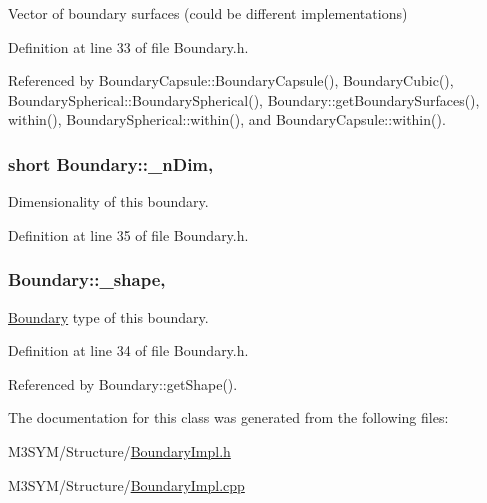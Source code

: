 Vector of boundary surfaces (could be different implementations) 



Definition at line 33 of file Boundary.\+h.



Referenced by Boundary\+Capsule\+::\+Boundary\+Capsule(), Boundary\+Cubic(), Boundary\+Spherical\+::\+Boundary\+Spherical(), Boundary\+::get\+Boundary\+Surfaces(), within(), Boundary\+Spherical\+::within(), and Boundary\+Capsule\+::within().

\hypertarget{classBoundary_a96f2294e0c822ab216fe5ab7e17258c7}{
\subsubsection[{\+\_\+n\+Dim}]{\setlength{\rightskip}{0pt plus 5cm}short Boundary\+::\+\_\+n\+Dim\hspace{0.3cm}{\ttfamily [protected]}, {\ttfamily [inherited]}}}\label{classBoundary_a96f2294e0c822ab216fe5ab7e17258c7}


Dimensionality of this boundary. 



Definition at line 35 of file Boundary.\+h.

\hypertarget{classBoundary_a04c10c9a7aea1924d779d392e29f94ff}{
\subsubsection[{\+\_\+shape}]{ Boundary\+::\+\_\+shape\hspace{0.3cm}{\ttfamily [protected]}, {\ttfamily [inherited]}}}\label{classBoundary_a04c10c9a7aea1924d779d392e29f94ff}


\hyperlink{classBoundary}{Boundary} type of this boundary. 



Definition at line 34 of file Boundary.\+h.



Referenced by Boundary\+::get\+Shape().



The documentation for this class was generated from the following files\+:\begin{DoxyCompactItemize}
\item 
M3\+S\+Y\+M/\+Structure/\hyperlink{BoundaryImpl_8h}{Boundary\+Impl.\+h}\item 
M3\+S\+Y\+M/\+Structure/\hyperlink{BoundaryImpl_8cpp}{Boundary\+Impl.\+cpp}\end{DoxyCompactItemize}
